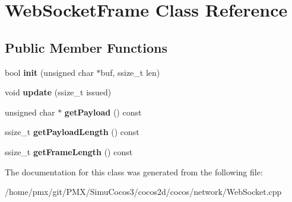 \hypertarget{classWebSocketFrame}{}\section{Web\+Socket\+Frame Class Reference}
\label{classWebSocketFrame}
\subsection*{Public Member Functions}
\begin{DoxyCompactItemize}
\item 
\mbox{\label{classWebSocketFrame_a54a501d593d36e6b50e203327dc1ab54}} 
bool {\bfseries init} (unsigned char $\ast$buf, ssize\+\_\+t len)
\item 
\mbox{\label{classWebSocketFrame_ab9c2b38f0f2a37beb81a96c9f17ae857}} 
void {\bfseries update} (ssize\+\_\+t issued)
\item 
\mbox{\label{classWebSocketFrame_a1b7f02a621949cea9fab06982f20d29c}} 
unsigned char $\ast$ {\bfseries get\+Payload} () const
\item 
\mbox{\label{classWebSocketFrame_a36fcd1670064f540aa1ef9e960528179}} 
ssize\+\_\+t {\bfseries get\+Payload\+Length} () const
\item 
\mbox{\label{classWebSocketFrame_a9886c1d01ddeca475f923b44cf8955a8}} 
ssize\+\_\+t {\bfseries get\+Frame\+Length} () const
\end{DoxyCompactItemize}


The documentation for this class was generated from the following file\+:\begin{DoxyCompactItemize}
\item 
/home/pmx/git/\+P\+M\+X/\+Simu\+Cocos3/cocos2d/cocos/network/Web\+Socket.\+cpp\end{DoxyCompactItemize}
